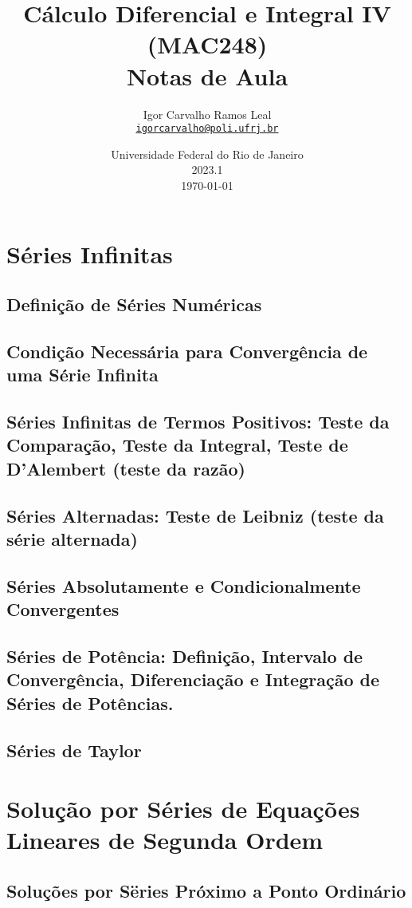 \documentclass{article}
\title{Cálculo Diferencial e Integral IV (MAC248)\\Notas de Aula}
\author{Igor Carvalho Ramos Leal\\\href{mailto:igorcarvalho@poli.ufrj.br}{\texttt{igorcarvalho@poli.ufrj.br}}}
\date{Universidade Federal do Rio de Janeiro\\2023.1\\\today}
\begin{document}
\maketitle
\tableofcontents

\section{Séries Infinitas}


\subsection{Definição de Séries Numéricas}
\subsection{Condição Necessária para Convergência de uma Série Infinita}
\subsection{Séries Infinitas de Termos Positivos: Teste da Comparação, Teste da Integral, Teste de D'Alembert (teste da razão)}
\subsection{Séries Alternadas: Teste de Leibniz (teste da série alternada)}
\subsection{Séries Absolutamente e Condicionalmente Convergentes}
\subsection{Séries de Potência: Definição, Intervalo de Convergência, Diferenciação e Integração de Séries de Potências.}
\subsection{Séries de Taylor}

\section{Solução por Séries de Equações Lineares de Segunda Ordem}
\subsection{Soluções por Sëries Próximo a Ponto Ordinário}
\end{document}
